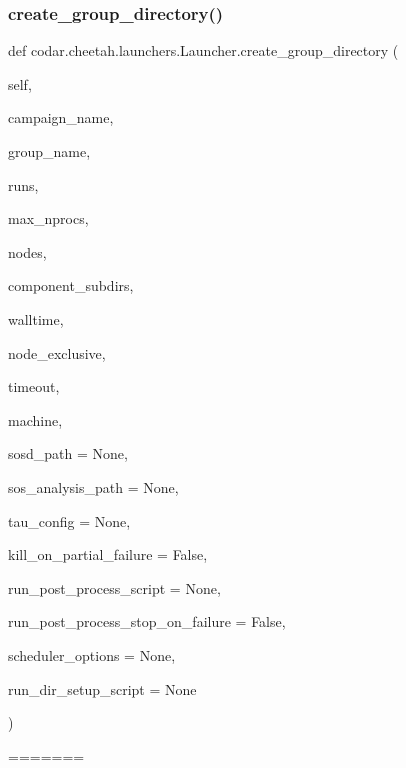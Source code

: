 \subsubsection{\texorpdfstring{create\+\_\+group\+\_\+directory()}{create\_group\_directory()}}
{\footnotesize\ttfamily def codar.\+cheetah.\+launchers.\+Launcher.\+create\+\_\+group\+\_\+directory (\begin{DoxyParamCaption}\item[{}]{self,  }\item[{}]{campaign\+\_\+name,  }\item[{}]{group\+\_\+name,  }\item[{}]{runs,  }\item[{}]{max\+\_\+nprocs,  }\item[{}]{nodes,  }\item[{}]{component\+\_\+subdirs,  }\item[{}]{walltime,  }\item[{}]{node\+\_\+exclusive,  }\item[{}]{timeout,  }\item[{}]{machine,  }\item[{}]{sosd\+\_\+path = {\ttfamily None},  }\item[{}]{sos\+\_\+analysis\+\_\+path = {\ttfamily None},  }\item[{}]{tau\+\_\+config = {\ttfamily None},  }\item[{}]{kill\+\_\+on\+\_\+partial\+\_\+failure = {\ttfamily False},  }\item[{}]{run\+\_\+post\+\_\+process\+\_\+script = {\ttfamily None},  }\item[{}]{run\+\_\+post\+\_\+process\+\_\+stop\+\_\+on\+\_\+failure = {\ttfamily False},  }\item[{}]{scheduler\+\_\+options = {\ttfamily None},  }\item[{}]{run\+\_\+dir\+\_\+setup\+\_\+script = {\ttfamily None} }\end{DoxyParamCaption})}
=======
\mbox{\label{classcodar_1_1cheetah_1_1launchers_1_1_launcher_a961dc12bab6b346c28372995b9873e46}} 
